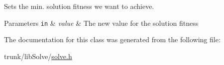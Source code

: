 Sets the min. solution fitness we want to achieve. 
\begin{DoxyParams}[1]{Parameters}
\mbox{\tt in}  & {\em value} & The new value for the solution fitness \\
\hline
\end{DoxyParams}


The documentation for this class was generated from the following file\-:\begin{DoxyCompactItemize}
\item 
trunk/lib\-Solve/\hyperlink{solve_8h}{solve.\-h}\end{DoxyCompactItemize}
